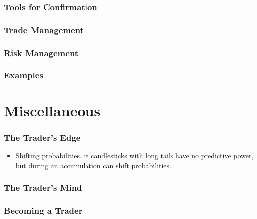 \documentclass{../notes}
\begin{document}
\section{Tools for Confirmation}
\section{Trade Management}
\section{Risk Management}
\section{Examples}

\part{Miscellaneous}
\section{The Trader's Edge}
\begin{itemize}
  \item Shifting probabilities. ie candlesticks with long tails have no predictive power, but during an accumulation can shift probabilities.
\end{itemize}
\section{The Trader's Mind}
\section{Becoming a Trader}
\end{document}
